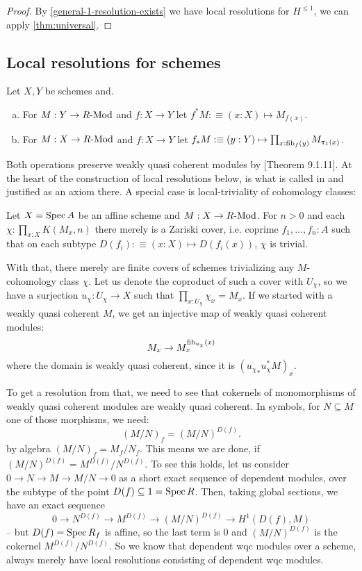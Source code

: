 \begin{proof}
  By \cref{general-1-resolution-exists} we have local resolutions for $H^{\leq 1}$,
  we can apply \cref{thm:universal}.
\end{proof}

\subsection{Local resolutions for schemes}

\begin{definition}
  Let $X,Y$ be schemes and.
  \begin{enumerate}[(a)]
  \item For $M:Y\to R\text{-}\mathrm{Mod}$ and $f:X\to Y$ let $f^*M:\equiv (x:X)\mapsto M_{f(x)}$.
  \item For $M:X\to R\text{-}\mathrm{Mod}$ and $f:X\to Y$ let $f_*M:\equiv (y:Y)\mapsto \prod_{x:\mathrm{fib}_f(y)}M_{\pi_1(x)}$.
  \end{enumerate}
\end{definition}

Both operations preserve weakly quasi coherent modules by \cite{draft}[Theorem 9.1.11].
At the heart of the construction of local resolutions below,
is what is called  in \cite{draft} and justified as an axiom there.
A special case is local-triviality of cohomology classes:

\begin{axiom}
  Let $X=\operatorname{Spec} A$ be an affine scheme and $M:X\to R\text{-}\mathrm{Mod}$.
  For $n>0$ and each $\chi:\prod_{x:X}K(M_x,n)$ there merely is a Zariski cover,
  i.e. coprime
  $f_1,\dots,f_n:A$ such that on each subtype $D(f_i):\equiv (x:X)\mapsto D(f_i(x))$,
  $\chi$ is trivial.
\end{axiom}

With that, there merely are finite covers of schemes trivializing any $M$-cohomology class $\chi$.
Let us denote the coproduct of such a cover with $U_\chi$,
so we have a surjection $u_\chi:U_\chi\to X$ such that $\prod_{x:U_\chi}\chi_x=M_x$.
If we started with a weakly quasi coherent $M$,
we get an injective map of weakly quasi coherent modules:
\[
  M_x \to M_x^{\mathrm{fib}_{u_\chi}(x)}
\]
where the domain is weakly quasi coherent, since it is $({u_\chi}_*u_\chi^*M)_x$.

To get a resolution from that, we need to see that cokernels of monomorphisms
of weakly quasi coherent modules are weakly quasi coherent.
In symbols, for $N\subseteq M$ one of those morphisms, we need:
\[
  (M/N)_f=(M/N)^{D(f)}.
\]
by algebra $(M/N)_f=M_f/N_f$.
This means we are done, if $(M/N)^{D(f)}=M^{D(f)}/{N^{D(f)}}$.
To see this holds, let us consider $0\to N\to M\to M/N\to 0$ as a short exact sequence of dependent modules,
over the subtype of the point $D(f)\subseteq 1=\operatorname{Spec} R$.
Then, taking global sections, we have an exact sequence
\[
 0\to N^{D(f)}\to M^{D(f)}\to (M/N)^{D(f)}\to H^1(D(f),M)
\]
-- but $D(f)=\operatorname{Spec} R_f$ is affine,
so the last term is 0 and $(M/N)^{D(f)}$ is the cokernel $M^{D(f)}/N^{D(f)}$.
So we know that dependent wqc modules over a scheme,
always merely have local resolutions consisting of dependent wqc modules.

